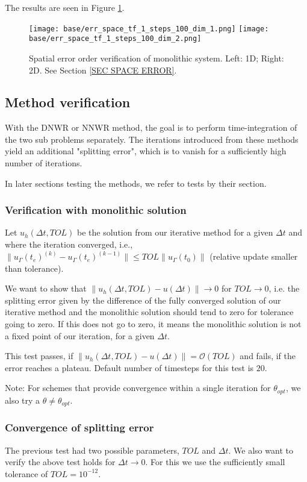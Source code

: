 \documentclass[a4paper,10pt]{article}
\begin{document}
The results are seen in Figure \ref{FIG SPACE ERR}.

\begin{figure}[!ht]
\begin{center}
\texttt{[image: base/err\_space\_tf\_1\_steps\_100\_dim\_1.png]}
\texttt{[image: base/err\_space\_tf\_1\_steps\_100\_dim\_2.png]}
\caption{Spatial error order verification of monolithic system. Left: 1D; Right: 2D. See Section \ref{SEC SPACE ERROR}.}
\label{FIG SPACE ERR}
\end{center}
\end{figure}
% 
\FloatBarrier
\subsection{Method verification}
% 
With the DNWR or NNWR method, the goal is to perform time-integration of the two sub problems separately. The iterations introduced from these methods yield an additional "splitting error", which is to vanish for a sufficiently high number of iterations.

In later sections testing the methods, we refer to tests by their section.
% 
\subsubsection{Verification with monolithic solution}\label{TEST MONO CONV}
% 
Let $u_h(\Delta t, TOL)$ be the solution from our iterative method for a given $\Delta t$ and where the iteration converged, i.e., $\| u_\Gamma(t_e)^{(k)} - u_\Gamma(t_e)^{(k-1)}\| \leq TOL \| u_\Gamma(t_0)\|$ (relative update smaller than tolerance).

We want to show that $\| u_h(\Delta t, TOL) - u(\Delta t)\| \rightarrow 0$ for $TOL \rightarrow 0$, i.e. the splitting error given by the difference of the fully converged solution of our iterative method and the monolithic solution should tend to zero for tolerance going to zero. If this does not go to zero, it means the monolithic solution is not a fixed point of our iteration, for a given $\Delta t$.

This test passes, if $\| u_h(\Delta t, TOL) - u(\Delta t)\| = \mathcal{O}(TOL)$ and fails, if the error reaches a plateau. Default number of timesteps for this test is $20$.

Note: For schemes that provide convergence within a single iteration for $\theta_{opt}$, we also try a $\theta \neq \theta_{opt}$.
% 
\subsubsection{Convergence of splitting error}\label{TEST SPLIT ERROR}
% 
The previous test had two possible parameters, $TOL$ and $\Delta t$. We also want to verify the above test holds for $\Delta t \rightarrow 0$. For this we use the sufficiently small tolerance of $TOL = 10^{-12}$.
\end{document}
